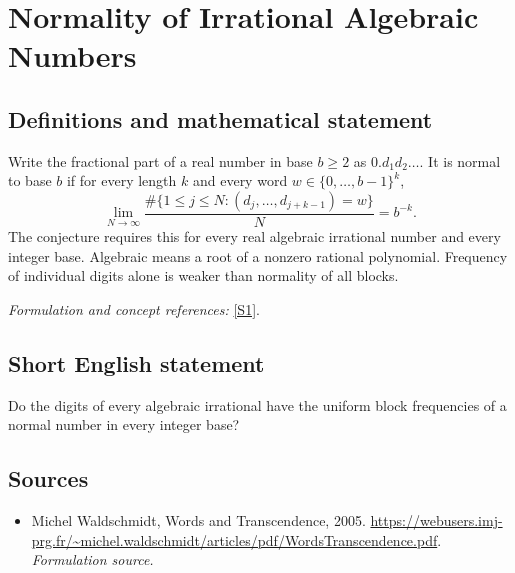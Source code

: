 \documentclass[11pt]{article}
\begin{document}
\section*{\texorpdfstring{Normality of Irrational Algebraic Numbers}{Normality of Irrational Algebraic Numbers}}\label{1259}
\subsection{Definitions and mathematical statement}
Write the fractional part of a real number in base $b\ge2$ as $0.d_1d_2\ldots$. It is normal to base $b$ if for every length $k$ and every word $w\in\{0,\ldots,b-1\}^k$,
\[
 \lim_{N\to\infty}\frac{\#\{1\le j\le N:(d_j,\ldots,d_{j+k-1})=w\}}{N}=b^{-k}.
\]
The conjecture requires this for every real algebraic irrational number and every integer base. Algebraic means a root of a nonzero rational polynomial. Frequency of individual digits alone is weaker than normality of all blocks.
\par\smallskip\textit{Formulation and concept references:} \href{https://webusers.imj-prg.fr/~michel.waldschmidt/articles/pdf/WordsTranscendence.pdf}{[S1]}.

\subsection{Short English statement}
Do the digits of every algebraic irrational have the uniform block frequencies of a normal number in every integer base?
\subsection{Sources}
\begin{itemize}
\item[S1]Michel Waldschmidt, Words and Transcendence, 2005.
\url{https://webusers.imj-prg.fr/~michel.waldschmidt/articles/pdf/WordsTranscendence.pdf}.
\textit{Formulation source.}
\end{itemize}
\end{document}
